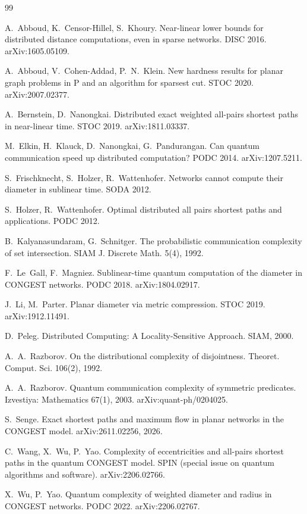 \documentclass[11pt]{article}
\theoremstyle{definition}
\theoremstyle{remark}
\begin{document}
\begin{thebibliography}{99}\small

 A.~Abboud, K.~Censor-Hillel, S.~Khoury. Near-linear lower bounds for distributed distance computations, even in sparse networks. DISC 2016. arXiv:1605.05109.

 A.~Abboud, V.~Cohen-Addad, P.~N.~Klein. New hardness results for planar graph problems in P and an algorithm for sparsest cut. STOC 2020. arXiv:2007.02377.

 A.~Bernstein, D.~Nanongkai. Distributed exact weighted all-pairs shortest paths in near-linear time. STOC 2019. arXiv:1811.03337.

 M.~Elkin, H.~Klauck, D.~Nanongkai, G.~Pandurangan. Can quantum communication speed up distributed computation? PODC 2014. arXiv:1207.5211.

 S.~Frischknecht, S.~Holzer, R.~Wattenhofer. Networks cannot compute their diameter in sublinear time. SODA 2012.

 S.~Holzer, R.~Wattenhofer. Optimal distributed all pairs shortest paths and applications. PODC 2012.

 B.~Kalyanasundaram, G.~Schnitger. The probabilistic communication complexity of set intersection. SIAM J. Discrete Math. 5(4), 1992.

 F.~Le~Gall, F.~Magniez. Sublinear-time quantum computation of the diameter in CONGEST networks. PODC 2018. arXiv:1804.02917.

 J.~Li, M.~Parter. Planar diameter via metric compression. STOC 2019. arXiv:1912.11491.

 D.~Peleg. Distributed Computing: A Locality-Sensitive Approach. SIAM, 2000.

 A.~A.~Razborov. On the distributional complexity of disjointness. Theoret. Comput. Sci. 106(2), 1992.

 A.~A.~Razborov. Quantum communication complexity of symmetric predicates. Izvestiya: Mathematics 67(1), 2003. arXiv:quant-ph/0204025.

 S.~Senge. Exact shortest paths and maximum flow in planar networks in the CONGEST model. arXiv:2611.02256, 2026.

 C.~Wang, X.~Wu, P.~Yao. Complexity of eccentricities and all-pairs shortest paths in the quantum CONGEST model. SPIN (special issue on quantum algorithms and software). arXiv:2206.02766.

 X.~Wu, P.~Yao. Quantum complexity of weighted diameter and radius in CONGEST networks. PODC 2022. arXiv:2206.02767.

\end{thebibliography}
\end{document}
